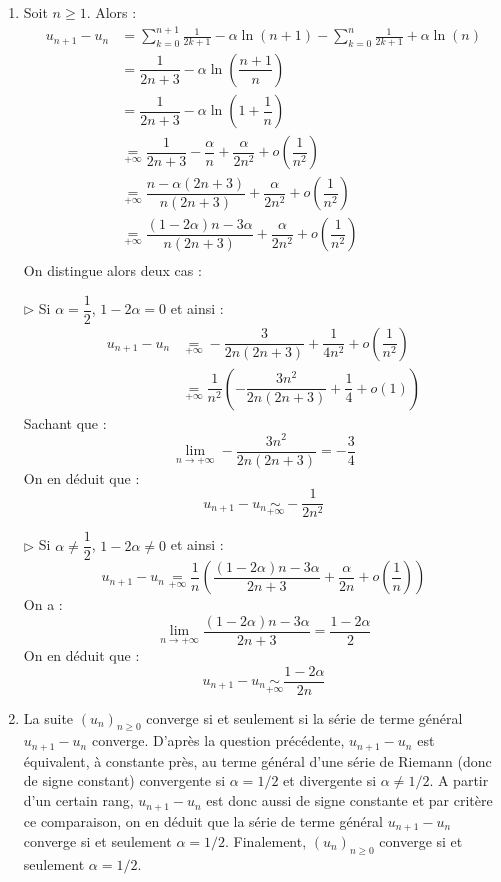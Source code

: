 \documentclass[a4paper,10pt]{report}
\begin{document}
\corr 

\begin{enumerate}
\item Soit $n \geq 1$. Alors :
\begin{align*}
u_{n+1}-u_n & = \sum_{k=0}^{n+1} \frac{1}{2k+1} -  \alpha \ln(n+1) -\sum_{k=0}^n \frac{1}{2k+1} + \alpha \ln(n) \\
& = \dfrac{1}{2n+3} - \alpha \ln \left( \dfrac{n+1}{n} \right) \\
& = \dfrac{1}{2n+3} - \alpha \ln \left( 1+ \dfrac{1}{n} \right) \\
& \underset{+ \infty}{=} \dfrac{1}{2n+3} - \dfrac{\alpha}{n}  + \dfrac{\alpha}{2n^2} + o \left( \dfrac{1}{n^2} \right) \\
& \underset{+ \infty}{=} \dfrac{n- \alpha(2n+3)}{n(2n+3)}  +\dfrac{\alpha}{2n^2} + o \left( \dfrac{1}{n^2} \right) \\
& \underset{+ \infty}{=} \dfrac{(1-2 \alpha)n - 3 \alpha}{n(2n+3)}  +\dfrac{\alpha}{2n^2} + o \left( \dfrac{1}{n^2} \right) \\
\end{align*}
On distingue alors deux cas :

\medskip

\noindent $\rhd$ Si $\alpha = \dfrac{1}{2}$, $1-2 \alpha=0$ et ainsi :
\begin{align*}
 u_{n+1}-u_n & \underset{+ \infty}{=} -\dfrac{3}{2n(2n+3)}  + \dfrac{1}{4n^2} + o \left( \dfrac{1}{n^2} \right) \\
 & \underset{+ \infty}{=} \dfrac{1}{n^2} \left( -\dfrac{3n^2}{2n(2n+3)}  + \dfrac{1}{4} + o (1) \right) 
 \end{align*}
 Sachant que :
 $$ \lim_{n \rightarrow + \infty} -\dfrac{3n^2}{2n(2n+3)} = - \dfrac{3}{4}$$
 On en déduit que :
 $$ u_{n+1}-u_n \underset{+ \infty}{\sim} - \dfrac{1}{2n^2}$$

\medskip

\noindent $\rhd$ Si $\alpha \neq \dfrac{1}{2}$, $1-2 \alpha \neq 0$ et ainsi :
$$
 u_{n+1}-u_n  \underset{+ \infty}{=} \dfrac{1}{n} \left( \dfrac{(1-2 \alpha)n - 3 \alpha}{2n+3}  +\dfrac{\alpha}{2n} + o \left( \dfrac{1}{n} \right)\right)
 $$
On a :
$$ \lim_{n \rightarrow + \infty} \dfrac{(1-2 \alpha)n - 3 \alpha}{2n+3}  = \dfrac{1-2 \alpha}{2}$$
On en déduit que :
$$ u_{n+1}-u_n \underset{+ \infty}{\sim}  \dfrac{1-2 \alpha}{2n}$$
\item La suite $(u_n)_{n \geq 0}$ converge si et seulement si la série de terme général $u_{n+1}-u_n$ converge. D'après la question précédente, $u_{n+1}-u_n$ est équivalent, à constante près, au terme général d'une série de Riemann (donc de signe constant) convergente si $\alpha = 1/2$ et divergente si $\alpha \neq 1/2$. A partir d'un certain rang, $u_{n+1}-u_n$ est donc aussi de signe constante et par critère ce comparaison, on en déduit que la série de terme général $u_{n+1}-u_n$ converge si et seulement $\alpha =1/2$. Finalement, $(u_n)_{n \geq 0}$ converge si et seulement $\alpha = 1/2$.
\end{enumerate}
\end{document}
